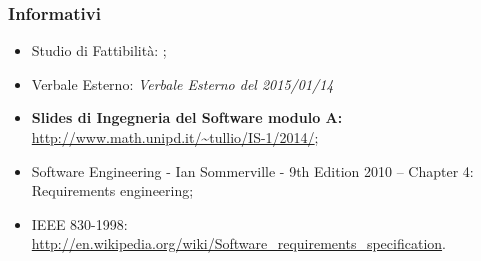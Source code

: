 	\subsubsection{Informativi}
		\begin{itemize}
			\item Studio di Fattibilità: \docNameVersionSdF;
			\item Verbale Esterno: \emph{Verbale Esterno del 2015/01/14}
			\item \textbf{Slides di Ingegneria del Software modulo A:} \url{http://www.math.unipd.it/~tullio/IS-1/2014/};
			\item Software Engineering - Ian Sommerville - 9th Edition 2010 – Chapter 4: Requirements engineering;
			\item IEEE 830-1998: \url{http://en.wikipedia.org/wiki/Software_requirements_specification}.
		\end{itemize}
